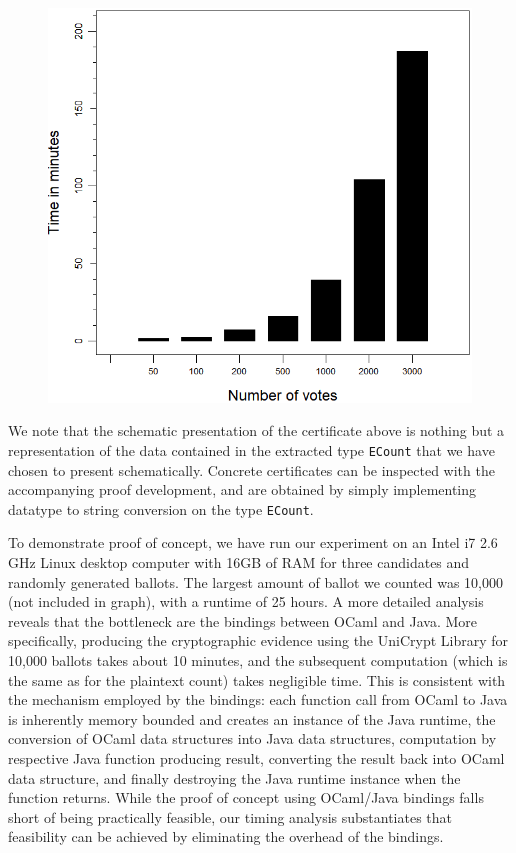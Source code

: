 \begin{figure}
\centering
\vspace*{-1cm}
\includegraphics[scale=0.30]{PlotVer3.png}
\vspace*{-1cm}
\end{figure}
 We note that the schematic presentation of the certificate above is
 nothing but a representation of the data contained in the extracted
 type \texttt{ECount} that we have chosen to present schematically.
 Concrete certificates can be inspected with the accompanying proof
 development, and are obtained by simply implementing datatype to
 string conversion on the type \texttt{ECount}.
 



To demonstrate proof of concept, 
we have run our experiment on an  Intel  i7  2.6  GHz  Linux  desktop  computer
with  16GB  of  RAM for three candidates and randomly generated ballots. The 
largest  amount of ballot we counted was 10,000 (not included in
graph), with a runtime of 25 hours. A more detailed analysis reveals
that the bottleneck are the bindings between OCaml and Java. More
specifically, producing the cryptographic evidence using the
UniCrypt Library for 10,000 ballots takes about 10 minutes, and the
subsequent computation (which is the same as for the plaintext
count) takes negligible time. This is consistent with the mechanism
employed by the bindings:
each function call from OCaml to Java is inherently memory bounded
and creates an instance of the Java runtime, 
the conversion of OCaml data structures into Java data
structures, 
computation by respective Java function producing result,
converting the result back into OCaml data structure, and finally destroying 
the Java runtime instance when the function returns. While the proof
of concept using OCaml/Java bindings falls short of being
practically feasible, our timing analysis substantiates that
feasibility can be achieved by eliminating the overhead of the
bindings. 


